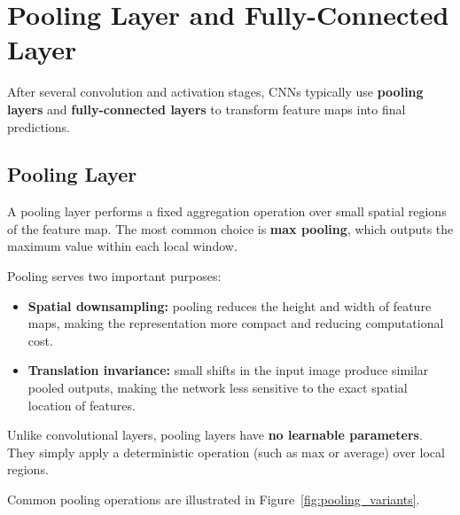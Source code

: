 \documentclass{article}
\begin{document}


\section{Pooling Layer and Fully-Connected Layer}

After several convolution and activation stages, CNNs typically use
\textbf{pooling layers} and \textbf{fully-connected layers} to transform
feature maps into final predictions.

\subsection{Pooling Layer}

A pooling layer performs a fixed aggregation operation over small spatial
regions of the feature map. The most common choice is \textbf{max pooling},
which outputs the maximum value within each local window.

Pooling serves two important purposes:

\begin{itemize}
    \item \textbf{Spatial downsampling:} pooling reduces the height and width
    of feature maps, making the representation more compact and reducing
    computational cost.
    \item \textbf{Translation invariance:} small shifts in the input image
    produce similar pooled outputs, making the network less sensitive to the
    exact spatial location of features.
\end{itemize}

Unlike convolutional layers, pooling layers have \textbf{no learnable
parameters}. They simply apply a deterministic operation (such as max or
average) over local regions.

Common pooling operations are illustrated in
Figure~\ref{fig:pooling_variants}.
\end{document}
